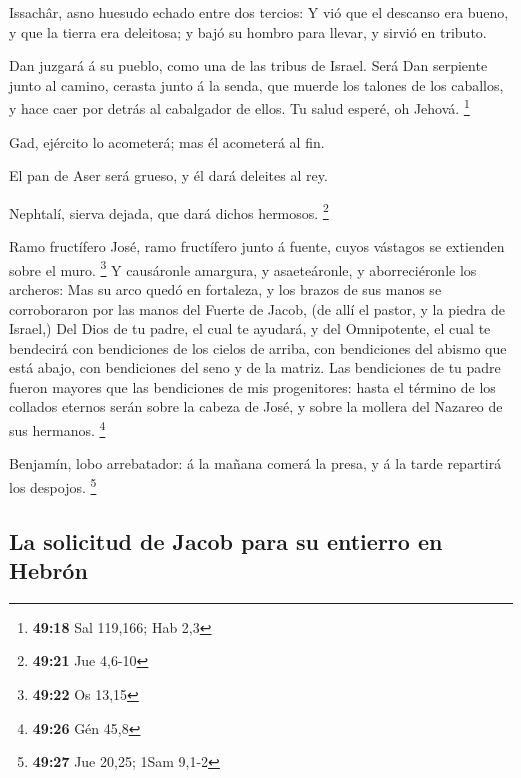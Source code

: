 Issachâr, asno huesudo echado entre dos tercios:
 Y vió que el descanso era bueno, y que la tierra era
deleitosa; y bajó su hombro para llevar, y sirvió en tributo.

 Dan juzgará á su pueblo, como una de las tribus de Israel.
 Será Dan serpiente junto al camino, cerasta junto á la
senda, que muerde los talones de los caballos, y hace caer por detrás al
cabalgador de ellos.  Tu salud esperé, oh Jehová.
\footnote{\textbf{49:18} Sal 119,166; Hab 2,3}

 Gad, ejército lo acometerá; mas él acometerá al fin.

 El pan de Aser será grueso, y él dará deleites al rey.

 Nephtalí, sierva dejada, que dará dichos hermosos.
\footnote{\textbf{49:21} Jue 4,6-10}

 Ramo fructífero José, ramo fructífero junto á fuente,
cuyos vástagos se extienden sobre el muro. \footnote{\textbf{49:22} Os
  13,15}  Y causáronle amargura, y asaeteáronle, y
aborreciéronle los archeros:  Mas su arco quedó en
fortaleza, y los brazos de sus manos se corroboraron por las manos del
Fuerte de Jacob, (de allí el pastor, y la piedra de Israel,)
 Del Dios de tu padre, el cual te ayudará, y del
Omnipotente, el cual te bendecirá con bendiciones de los cielos de
arriba, con bendiciones del abismo que está abajo, con bendiciones del
seno y de la matriz.  Las bendiciones de tu padre fueron
mayores que las bendiciones de mis progenitores: hasta el término de los
collados eternos serán sobre la cabeza de José, y sobre la mollera del
Nazareo de sus hermanos. \footnote{\textbf{49:26} Gén 45,8}

 Benjamín, lobo arrebatador: á la mañana comerá la presa, y
á la tarde repartirá los despojos. \footnote{\textbf{49:27} Jue 20,25;
  1Sam 9,1-2}

\hypertarget{la-solicitud-de-jacob-para-su-entierro-en-hebruxf3n}{%
\subsection{La solicitud de Jacob para su entierro en
Hebrón}\label{la-solicitud-de-jacob-para-su-entierro-en-hebruxf3n}}

